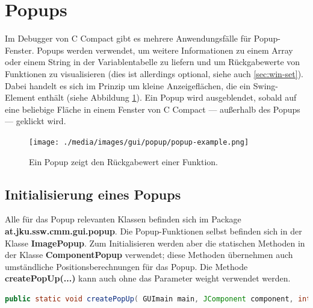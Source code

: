 


\section{Popups}
\label{sec:deb-popup}
Im Debugger von C Compact gibt es mehrere Anwendungsfälle für Popup-Fenster. Popups werden verwendet, um weitere Informationen zu einem Array oder einem String in der Variablentabelle zu liefern und um Rückgabewerte von Funktionen zu visualisieren (dies ist allerdings optional, siehe auch \ref{sec:win-set}). Dabei handelt es sich im Prinzip um kleine Anzeigeflächen, die ein Swing-Element enthält (siehe Abbildung \ref{fig:popup-example}). Ein Popup wird ausgeblendet, sobald auf eine beliebige Fläche in einem Fenster von C Compact --- außerhalb des Popups --- geklickt wird.

\begin{figure}[htp]
\centering
\texttt{[image: ./media/images/gui/popup/popup-example.png]}
\caption{Ein Popup zeigt den Rückgabewert einer Funktion.}
\label{fig:popup-example}
\end{figure}

\subsection{Initialisierung eines Popups}
Alle für das Popup relevanten Klassen befinden sich im Package \textbf{at.jku.ssw.cmm.gui.popup}. Die Popup-Funktionen selbst befinden sich in der Klasse \textbf{ImagePopup}. Zum Initialisieren werden aber die statischen Methoden in der Klasse \textbf{ComponentPopup} verwendet; diese Methoden übernehmen auch umständliche Positionsberechnungen für das Popup. Die Methode \textbf{createPopUp(...)} kann auch ohne das Parameter \glqq{}weight\grqq{} verwendet werden.
\begin{lstlisting}[language=JAVA]
public static void createPopUp( GUImain main, JComponent component, int x, int y, int w, int h, int orientation, double weight );
\end{lstlisting}

